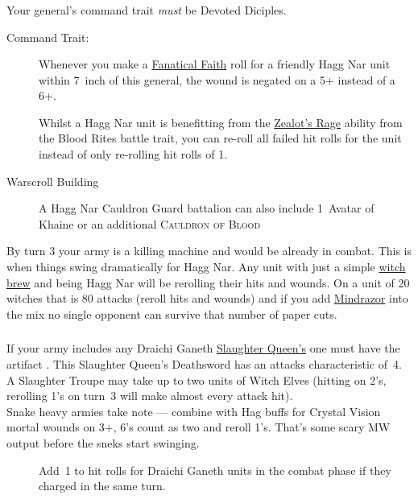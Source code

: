 \subsubsection{}
Your general's command trait \emph{must} be Devoted Diciples.
\begin{description} 
    \item [Command Trait: ]
        Whenever you make a \hyperref[fanatical-faith]{Fanatical Faith} roll
        for a friendly Hagg Nar unit within 7~inch of this general, the
        wound is negated on a 5+ instead of a 6+.  
    \item [] Whilst a Hagg
        Nar unit is benefitting from the \hyperref[zealots-rage]{Zealot's Rage}
        ability from the Blood Rites battle trait, you can re-roll all failed
        hit rolls for the unit instead of only re-rolling hit rolls of 1.
    \item [Warscroll Building] A Hagg Nar Cauldron Guard battalion can
        also include 1~Avatar of Khaine or an additional
        \textsc{Cauldron of Blood}
\end{description}
By turn 3 your army is a killing machine and would be already in combat. This is
when things swing dramatically for Hagg Nar. Any unit with just a simple
\hyperref[witchbrew]{witch brew} and being Hagg Nar will be rerolling their
hits and wounds. On a unit of 20 witches that is 80 attacks (reroll hits and
wounds) and if you add \hyperref[mindrazor]{Mindrazor} into the mix no single opponent
can survive that number of paper cuts. 

\subsubsection{}
If your army includes any Draichi Ganeth \hyperref[slaughter-queen]{Slaughter
Queen's} one must have the artifact \textbf{}. This Slaughter
Queen's Deathsword has an attacks characteristic of~4. A Slaughter Troupe
may take up to two units of Witch Elves (hitting on 2's, rerolling 1's on turn~3
will make almost every attack hit).\\
Snake heavy armies take note --- combine
with Hag buffs for Crystal Vision mortal wounds on 3+, 6's count as two and
reroll 1's. That's some scary MW output before the sneks start swinging.
\begin{description}
    \item [] Add~1 to hit rolls for Draichi
    Ganeth units in the combat phase if they charged in the same turn.
\end{description}

